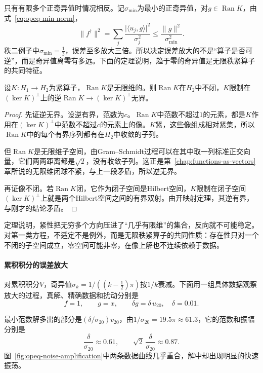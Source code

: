只有有限多个正奇异值时情况相反。记$\sigma_{\min}$为最小的正奇异值，对$g\in\operatorname{Ran}K$，由式~\eqref{eq:opeq-min-norm}，
\[
  \lVert f^\dagger\rVert^2
  =\sum_j\frac{\lvert\langle u_j,g\rangle\rvert^2}{\sigma_j^2}
  \leq\frac{\lVert g\rVert^2}{\sigma_{\min}^2}.
\]
秩二例子中$\sigma_{\min}=\frac13$，误差至多放大三倍。所以决定误差放大的不是“算子是否可逆”，而是奇异值离零有多远。下面的定理说明，趋于零的奇异值是无限秩紧算子的共同特征。

\begin{theorem}[紧算子的像不闭]
\label{thm:opeq-compact-range}
设$K:H_1\to H_2$为紧算子，$\operatorname{Ran}K$是无限维的。则$\operatorname{Ran}K$在$H_2$中不闭，$K$限制在$(\ker K)^\perp$上的逆$\operatorname{Ran}K\to(\ker K)^\perp$无界。
\end{theorem}

\begin{proof}
先证逆无界。设逆有界，范数为$c$。$\operatorname{Ran}K$中范数不超过$1$的元素，都是$K$作用在$(\ker K)^\perp$中范数不超过$c$的元素上的像。$K$紧，这些像组成相对紧集，所以$\operatorname{Ran}K$中的每个有界序列都有在$H_2$中收敛的子列。

但$\operatorname{Ran}K$是无限维子空间，由Gram--Schmidt过程可以在其中取一列标准正交向量，它们两两距离都是$\sqrt2$，没有收敛子列。这正是第~\ref{chap:functions-as-vectors}章所说的无限维闭球不紧，与上一段矛盾，所以逆无界。

再证像不闭。若$\operatorname{Ran}K$闭，它作为闭子空间是Hilbert空间，$K$限制在闭子空间$(\ker K)^\perp$上就是两个Hilbert空间之间的有界双射。由开映射定理，其逆有界，与刚才的结论矛盾。
\end{proof}

定理说明，紧性把无穷多个方向压进了“几乎有限维”的集合，反向就不可能稳定。对第一类方程，不适定不是例外，而是无限秩紧算子的共同性质：存在性只对一个不闭的子空间成立，零空间可能非零，在像上解也不连续依赖于数据。

\paragraph{累积积分的误差放大}
对累积积分$V$，奇异值$\sigma_k=1/((k-\frac12)\pi)$按$1/k$衰减。下面用一组具体数据观察放大的过程，真解、精确数据和扰动分别是
\[
  f=1,\qquad g=x,\qquad \delta g=\delta\,u_{20},\quad \delta=0.01.
\]

最小范数解多出的部分是$(\delta/\sigma_{20})v_{20}$，由$1/\sigma_{20}=19.5\pi\approx61.3$，它的范数和振幅分别是
\[
  \frac{\delta}{\sigma_{20}}\approx0.61,\qquad
  \sqrt2\,\frac{\delta}{\sigma_{20}}\approx0.87.
\]
图~\ref{fig:opeq-noise-amplification}中两条数据曲线几乎重合，解中却出现明显的快速振荡。

